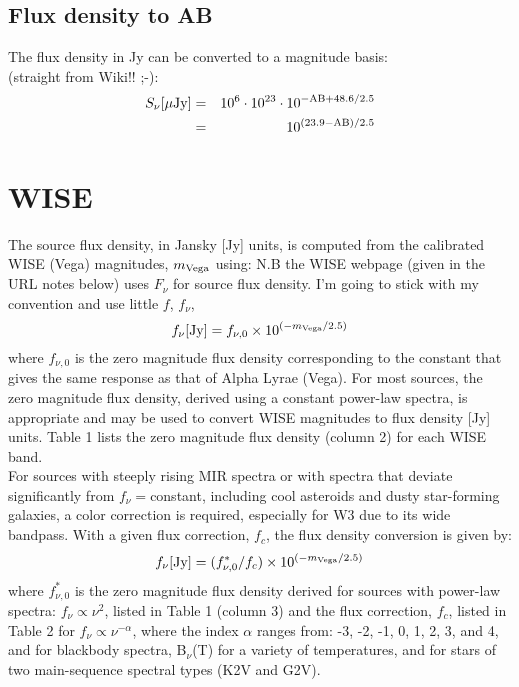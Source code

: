 \documentclass[11pt,a4paper]{article}
\begin{document}
    \subsection{Flux density to AB}
    The flux density in Jy can be converted to a magnitude basis:\\
    (straight from Wiki!! ;-):\\
    \begin{eqnarray}
      S_{\nu} [\mu {\rm Jy} ]  & = & 10^{6} \cdot 10^{23} \cdot 10^{-{{\rm AB} +48.6/2.5 }} \\
                                        & = & 10^{(23.9 - {\rm AB})/2.5} \\
    \end{eqnarray}




\section{WISE}
The source flux density, in Jansky [Jy] units, is computed from the calibrated WISE (Vega) magnitudes, $m_{\rm Vega}$ using:
N.B the WISE webpage (given in the URL notes below) uses $F_{\nu}$ for source flux density. I'm going to stick with my convention and use little $f$, $f_{\nu}$, 
\begin{equation}
  f_{\nu} [{\rm Jy}]  =  f_{\nu, 0} \times 10^{(-m_{\rm Vega}/2.5)} 
\end{equation}
where $f_{\nu, 0}$ is the zero magnitude flux density corresponding to the constant that gives the same response as that of Alpha Lyrae (Vega). For most sources, the zero magnitude flux density, derived using a constant power-law spectra, is appropriate and may be used to convert WISE magnitudes to flux density [Jy] units. Table 1 lists the zero magnitude flux density (column 2) for each WISE band.\\

\noindent
For sources with steeply rising MIR spectra or with spectra that deviate significantly from $f_{\nu}=$constant, including cool asteroids and dusty star-forming galaxies, a color correction is required, especially for W3 due to its wide bandpass. With a given flux correction, $f_{c}$, the flux density conversion is given by:
\begin{equation}
  f_{\nu} [{\rm Jy}]  = (f^{*}_{\nu, 0}/f_{c}) \times 10^{(-m_{\rm Vega}/2.5)} 
\end{equation}
where $f^{*}_{\nu, 0}$ is the zero magnitude flux density derived for sources with power-law spectra: $f_{\nu} \propto \nu^{2}$, listed in Table 1 (column 3) and the flux correction, $f_{c}$, listed in Table 2 for $f_{\nu} \propto \nu^{-\alpha}$, where the index $\alpha$  ranges from: -3, -2, -1, 0, 1, 2, 3, and 4, and for blackbody spectra, B$_{\nu}$(T) for a variety of temperatures, and for stars of two main-sequence spectral types (K2V and G2V). 
\end{document}

